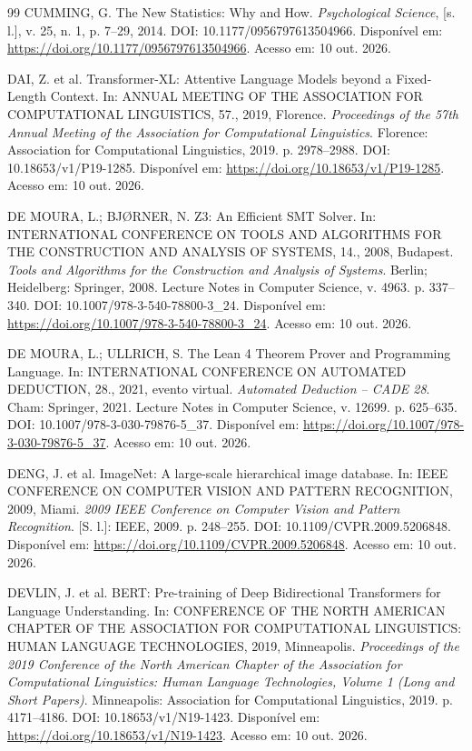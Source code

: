 \documentclass[12pt,openany,oneside,a4paper,brazil,chapter=TITLE]{abntex2}
\begin{document}
\begin{SingleSpacing}
\begin{thebibliography}{99}
 CUMMING, G. The New Statistics: Why and How. \textit{Psychological Science}, [s. l.], v. 25, n. 1, p. 7--29, 2014. DOI: 10.1177/0956797613504966. Disponível em: \url{https://doi.org/10.1177/0956797613504966}. Acesso em: 10 out. 2026.

 DAI, Z. et al. Transformer-XL: Attentive Language Models beyond a Fixed-Length Context. In: ANNUAL MEETING OF THE ASSOCIATION FOR COMPUTATIONAL LINGUISTICS, 57., 2019, Florence. \textit{Proceedings of the 57th Annual Meeting of the Association for Computational Linguistics}. Florence: Association for Computational Linguistics, 2019. p. 2978--2988. DOI: 10.18653/v1/P19-1285. Disponível em: \url{https://doi.org/10.18653/v1/P19-1285}. Acesso em: 10 out. 2026.

 DE MOURA, L.; BJØRNER, N. Z3: An Efficient SMT Solver. In: INTERNATIONAL CONFERENCE ON TOOLS AND ALGORITHMS FOR THE CONSTRUCTION AND ANALYSIS OF SYSTEMS, 14., 2008, Budapest. \textit{Tools and Algorithms for the Construction and Analysis of Systems}. Berlin; Heidelberg: Springer, 2008. Lecture Notes in Computer Science, v. 4963. p. 337--340. DOI: 10.1007/978-3-540-78800-3\_24. Disponível em: \url{https://doi.org/10.1007/978-3-540-78800-3_24}. Acesso em: 10 out. 2026.

 DE MOURA, L.; ULLRICH, S. The Lean 4 Theorem Prover and Programming Language. In: INTERNATIONAL CONFERENCE ON AUTOMATED DEDUCTION, 28., 2021, evento virtual. \textit{Automated Deduction -- CADE 28}. Cham: Springer, 2021. Lecture Notes in Computer Science, v. 12699. p. 625--635. DOI: 10.1007/978-3-030-79876-5\_37. Disponível em: \url{https://doi.org/10.1007/978-3-030-79876-5_37}. Acesso em: 10 out. 2026.

 DENG, J. et al. ImageNet: A large-scale hierarchical image database. In: IEEE CONFERENCE ON COMPUTER VISION AND PATTERN RECOGNITION, 2009, Miami. \textit{2009 IEEE Conference on Computer Vision and Pattern Recognition}. [S. l.]: IEEE, 2009. p. 248--255. DOI: 10.1109/CVPR.2009.5206848. Disponível em: \url{https://doi.org/10.1109/CVPR.2009.5206848}. Acesso em: 10 out. 2026.

 DEVLIN, J. et al. BERT: Pre-training of Deep Bidirectional Transformers for Language Understanding. In: CONFERENCE OF THE NORTH AMERICAN CHAPTER OF THE ASSOCIATION FOR COMPUTATIONAL LINGUISTICS: HUMAN LANGUAGE TECHNOLOGIES, 2019, Minneapolis. \textit{Proceedings of the 2019 Conference of the North American Chapter of the Association for Computational Linguistics: Human Language Technologies, Volume 1 (Long and Short Papers)}. Minneapolis: Association for Computational Linguistics, 2019. p. 4171--4186. DOI: 10.18653/v1/N19-1423. Disponível em: \url{https://doi.org/10.18653/v1/N19-1423}. Acesso em: 10 out. 2026.


\end{thebibliography}
\end{SingleSpacing}
\end{document}
